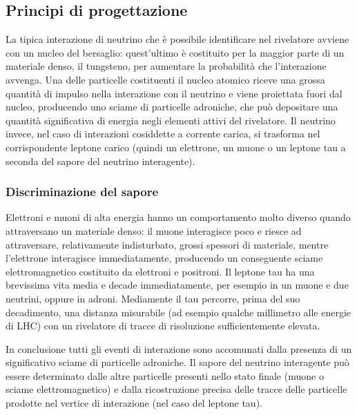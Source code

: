 \subsection{Principi di progettazione}
La tipica interazione di neutrino che è possibile identificare nel rivelatore avviene con un nucleo del bersaglio: quest'ultimo è costituito per la maggior parte di un materiale denso, il tungsteno, per aumentare la probabilità che l’interazione avvenga.
Una delle particelle costituenti il nucleo atomico riceve una grossa quantità di impulso nella interazione con il neutrino e viene proiettata fuori dal nucleo, producendo uno sciame di particelle adroniche, che può depositare una quantità significativa di energia negli elementi attivi del rivelatore.
Il neutrino invece, nel caso di interazioni cosiddette a corrente carica, si trasforma nel corrispondente leptone carico (quindi un elettrone, un muone o un leptone tau a seconda del sapore del neutrino interagente).

\subsubsection{Discriminazione del sapore}
Elettroni e muoni di alta energia hanno un comportamento molto diverso quando attraversano un materiale denso: il muone interagisce poco e riesce ad attraversare, relativamente indisturbato, grossi spessori di materiale, mentre l’elettrone interagisce immediatamente, producendo un conseguente sciame elettromagnetico costituito da elettroni e positroni.
Il leptone tau ha una brevissima vita media e decade immediatamente, per esempio in un muone e due neutrini, oppure in adroni.
Mediamente il tau percorre, prima del suo decadimento, una distanza misurabile (ad esempio qualche millimetro alle energie di LHC) con un rivelatore di tracce di risoluzione sufficientemente elevata.

In conclusione tutti gli eventi di interazione sono accomunati dalla presenza di un significativo sciame di particelle adroniche.
Il sapore del neutrino interagente può essere determinato dalle altre particelle presenti nello stato finale (muone o sciame elettromagnetico) e dalla ricostruzione precisa delle tracce delle particelle prodotte nel vertice di interazione (nel caso del leptone tau).

